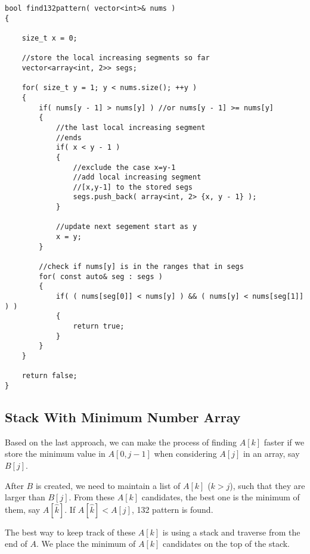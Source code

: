 \begin{lstlisting}[style=customc, caption={Search Intervals}]
bool find132pattern( vector<int>& nums )
{

    size_t x = 0;

    //store the local increasing segments so far
    vector<array<int, 2>> segs;

    for( size_t y = 1; y < nums.size(); ++y )
    {
        if( nums[y - 1] > nums[y] ) //or nums[y - 1] >= nums[y]
        {
            //the last local increasing segment
            //ends
            if( x < y - 1 )
            {
                //exclude the case x=y-1
                //add local increasing segment
                //[x,y-1] to the stored segs
                segs.push_back( array<int, 2> {x, y - 1} );
            }

            //update next segement start as y
            x = y;
        }

        //check if nums[y] is in the ranges that in segs
        for( const auto& seg : segs )
        {
            if( ( nums[seg[0]] < nums[y] ) && ( nums[y] < nums[seg[1]] ) )
            {
                return true;
            }
        }
    }

    return false;
}
\end{lstlisting}

 

\subsection{Stack With Minimum Number Array}
Based on the last approach, we can make the process of finding $A[k]$ faster if we store the minimum value in $A[0,j-1]$ when considering $A[j]$ in an array, say $B[j]$. 

After $B$ is created, we need to maintain a list of $A[k]$ ($k>j$), such that they are larger than $B[j]$. From these $A[k]$ candidates, the best one is the minimum of them, say $A[\hat{k}]$. If $A[\hat{k}] < A[j]$, 132 pattern is found. 

The best way to keep track of these $A[k]$ is using a stack and traverse from the end of $A$. We place the minimum of $A[k]$ candidates on the top of the stack. 

